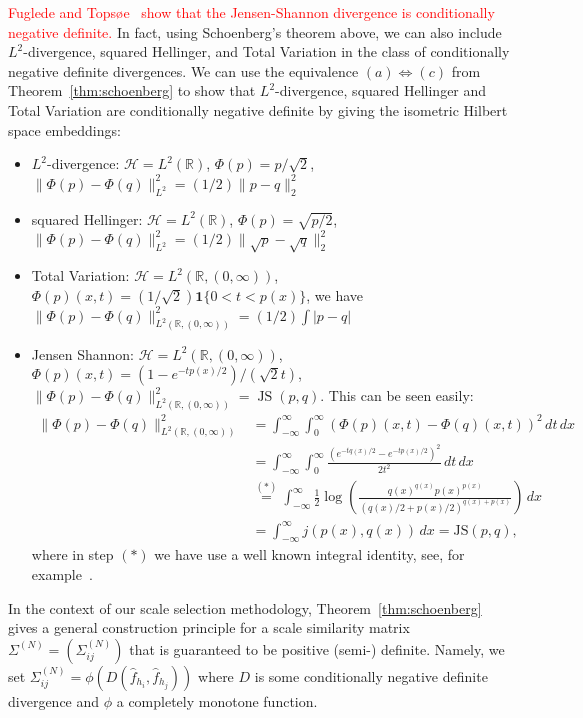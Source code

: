 \textcolor{red}{Fuglede and Topsøe~\cite{fuglede_jensen-shannon_2004} show that the Jensen-Shannon divergence is conditionally negative definite.} In fact, using Schoenberg's theorem above, we can also include $L^2$-divergence, squared Hellinger, and Total Variation in the class of conditionally negative definite divergences. We can use the equivalence $(a)\iff(c)$ from Theorem~\ref{thm:schoenberg} to show that $L^2$-divergence, squared Hellinger and Total Variation are conditionally negative definite by giving the isometric Hilbert space embeddings:
\begin{itemize}
    \item $L^2$-divergence: $\mathcal{H}=L^2(\mathbb{R})$, $\Phi(p)=p/\sqrt{2}$, $\|\Phi(p)-\Phi(q)\|_{L^2}^2=(1/2)\|p-q\|_2^2$
    \item squared Hellinger: $\mathcal{H}=L^2(\mathbb{R})$, $\Phi(p)=\sqrt{p/2}$, $\|\Phi(p)-\Phi(q)\|_{L^2}^2=(1/2)\|\sqrt{p}-\sqrt{q}\|_2^2$
    \item Total Variation: $\mathcal{H}=L^2(\mathbb{R},(0,\infty))$, $\Phi(p)(x,t)=(1/\sqrt{2})\mathbf{1}\{0<t<p(x)\}$, we have $\|\Phi(p)-\Phi(q)\|_{L^2(\mathbb{R},(0,\infty))}^2=(1/2)\int|p-q|$
    \item Jensen Shannon: $\mathcal{H}=L^2(\mathbb{R},(0,\infty))$, $\Phi(p)(x,t)=(1-e^{-tp(x)/2})/(\sqrt{2}t)$, $\|\Phi(p)-\Phi(q)\|_{L^2(\mathbb{R},(0,\infty))}^2=\operatorname{JS}(p,q)$. This can be seen easily:
    \begin{align*}
        \|\Phi(p)-\Phi(q)\|_{L^2(\mathbb{R},(0,\infty))}^2&=\int_{-\infty}^{\infty}\int_0^{\infty}\left(\Phi(p)(x,t)-\Phi(q)(x,t)\right)^2\,dt\,dx\\&
        =\int_{-\infty}^{\infty}\int_{0}^{\infty}\frac{\left(e^{-tq(x)/2}-e^{-tp(x)/2}\right)^2}{2t^2}\,dt\,dx\\&
        \stackrel{(\ast)}{=}\int_{-\infty}^{\infty}\frac{1}{2}\log{\left(\frac{q(x)^{q(x)}p(x)^{p(x)}}{(q(x)/2+p(x)/2)^{q(x)+p(x)}}\right)}\,dx\\&
        =\int_{-\infty}^{\infty}j(p(x),q(x))\,dx=\text{JS}(p,q),
    \end{align*}
    where in step $(\ast)$ we have use a well known integral identity, see, for example~\cite{yomikuan2020integral}.
\end{itemize}

In the context of our scale selection methodology, Theorem~\ref{thm:schoenberg} gives a general construction principle for a scale similarity matrix $\Sigma^{(N)}=(\Sigma^{(N)}_{ij})$ that is guaranteed to be positive (semi-) definite. Namely, we set $\Sigma^{(N)}_{ij}=\phi(D(\hat{f}_{h_i},\hat{f}_{h_j}))$ where $D$ is some conditionally negative definite divergence and $\phi$ a completely monotone function.

